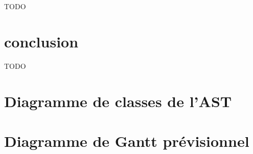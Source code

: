 \documentclass[a4paper]{article}%
\begin{document}
TODO

\clearpage
\section*{conclusion}

TODO

\pagestyle{empty}
\clearpage{}
\printbibliography[keyword={paper},title={Biliographie}]
\printbibliography[keyword={web},title={Webographie}]

\clearpage
\printglossaries

\appendix

\clearpage{}
\section{Diagramme de classes de l'AST}\label{appendix:classAST}

\begin{figure}[h]
  \begin{center}
  \end{center}
\end{figure}

\clearpage{}
\section{Diagramme de Gantt prévisionnel}\label{appendix:expectedgantt}
\end{document}

